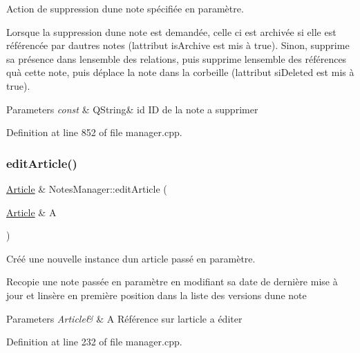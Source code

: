 Action de suppression d\textquotesingle{}une note spécifiée en paramètre. 

Lorsque la suppression d\textquotesingle{}une note est demandée, celle ci est archivée si elle est référencée par d\textquotesingle{}autres notes (l\textquotesingle{}attribut is\+Archive est mis à true). Sinon, supprime sa présence dans l\textquotesingle{}ensemble des relations, puis supprime l\textquotesingle{}ensemble des références qu\textquotesingle{}à cette note, puis déplace la note dans la corbeille (l\textquotesingle{}attribut si\+Deleted est mis à true). 
\begin{DoxyParams}{Parameters}
{\em const} & Q\+String\& id ID de la note a supprimer \\
\hline
\end{DoxyParams}


Definition at line 852 of file manager.\+cpp.

\mbox{\label{class_notes_manager_a3259c7aa22b5f2eee6f7bceddc707b1d}} 
\subsubsection{\texorpdfstring{edit\+Article()}{editArticle()}}
{\footnotesize\ttfamily \hyperlink{class_article}{Article} \& Notes\+Manager\+::edit\+Article (\begin{DoxyParamCaption}\item[{\hyperlink{class_article}{Article} \&}]{A }\end{DoxyParamCaption})}



Créé une nouvelle instance d\textquotesingle{}un article passé en paramètre. 

Recopie une note passée en paramètre en modifiant sa date de dernière mise à jour et l\textquotesingle{}insère en première position dans la liste des versions d\textquotesingle{}une note 
\begin{DoxyParams}{Parameters}
{\em Article\&} & A Référence sur l\textquotesingle{}article a éditer \\
\hline
\end{DoxyParams}


Definition at line 232 of file manager.\+cpp.

\mbox{\label{class_notes_manager_a1c4cfa021a12b6416c4e800d643b5e0a}} 
